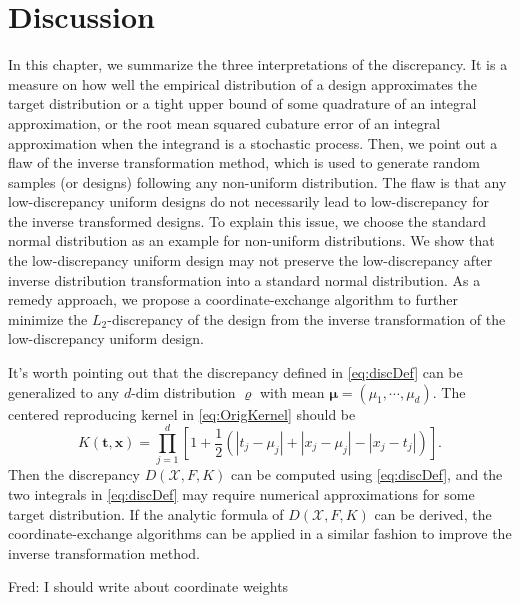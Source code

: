 \documentclass[graybox]{svmult}
\newcommand{\vx}{\boldsymbol{x}}
\newcommand{\vt}{\boldsymbol{t}}
\newcommand{\Xdes}{\mathcal{X}}
\newcommand{\Ftar}{F}
\newcommand{\FJH}[1]{{\color{blue}Fred: #1}}
\begin{document}
\section{Discussion}
In this chapter, we summarize the three interpretations of the discrepancy. 
It is a measure on how well the empirical distribution of a design approximates the target distribution or a tight upper bound of some quadrature of an integral approximation, or the root mean squared cubature error of an integral approximation when the integrand is a stochastic process. 
Then, we point out a flaw of the inverse transformation method, which is used to generate random samples (or designs) following any non-uniform distribution. 
The flaw is that any low-discrepancy uniform designs do not necessarily lead to low-discrepancy for the inverse transformed designs. 
To explain this issue, we choose the standard normal distribution as an example for non-uniform distributions. 
We show that the low-discrepancy uniform design may not preserve the low-discrepancy after inverse distribution transformation into a standard normal distribution. 
As a remedy approach, we propose a coordinate-exchange algorithm to further minimize the $L_2$-discrepancy of the design from the inverse transformation of the low-discrepancy uniform design. 

It's worth pointing out that the discrepancy defined in \eqref{eq:discDef} can be generalized to any $d$-dim distribution $\varrho$ with mean $\boldsymbol{\mu} = (\mu_1,\cdots,\mu_d)$. The centered reproducing kernel in \eqref{eq:OrigKernel} should be 
\begin{equation} \label{ExtKernel}
     K(\vt,\vx)  = \prod\limits_{j=1}^d\left[1+ \frac 12 \left(|t_j-\mu_j|+ |x_j-\mu_j|- |x_j-t_j| \right)\right].
\end{equation}
Then the discrepancy $D(\Xdes,\Ftar,K)$ can be computed using \eqref{eq:discDef}, and the two integrals in \eqref{eq:discDef} may require numerical approximations for some target distribution. 
If the analytic formula of $D(\Xdes,\Ftar,K)$ can be derived, the coordinate-exchange algorithms can be applied in a similar fashion to improve the inverse transformation method. 

\FJH{I should write about coordinate weights}
\end{document}
